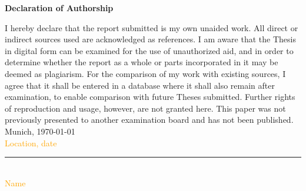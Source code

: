 \documentclass[12pt]{article}
\begin{document}
\newpage


\Large
\noindent
\textbf{Declaration of Authorship}
\vspace{0.5cm}
\noindent
\normalsize

I hereby declare that the report submitted is my own unaided work. All direct
or indirect sources used are acknowledged as references. I am aware that the
Thesis in digital form can be examined for the use of unauthorized aid, and in
order to determine whether the report as a whole or parts incorporated in it may
be deemed as plagiarism. For the comparison of my work with existing sources, I
agree that it shall be entered in a database where it shall also remain after
examination, to enable comparison with future Theses submitted. Further rights
of reproduction and usage, however, are not granted here. This paper was not
previously presented to another examination board and has not been published.
\\

\vspace{1cm}
Munich, \today\\
\textcolor{orange}{Location, date} \\

\vspace{3cm}

\noindent\rule{0.5\textwidth}{0.4pt} \\

\textcolor{orange}{Name}

\end{document}
